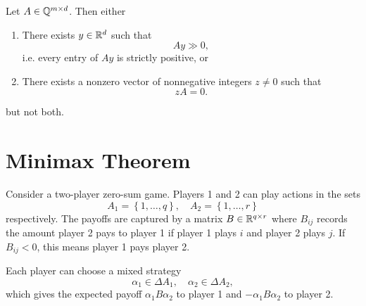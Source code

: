 \begin{lemma}[Gordan's]
	Let $A \in \mathbb{Q}^{m \times d}$. Then either
	\begin{enumerate}[label = (\roman*)]
		\item There exists $y \in \mathbb{R}^d$ such that  \[
			Ay \gg 0
		,\] i.e. every entry of $Ay$ is strictly positive, or
		\item There exists a nonzero vector of nonnegative integers $z \ne 0$ such that \[
			zA = 0
		.\] 
	\end{enumerate}
	but not both.
\end{lemma}

\section{Minimax Theorem}

Consider a two-player zero-sum game. Players 1 and 2 can play actions in the sets \[
	A_1 = \left\{1,\ldots,q\right\}, \quad A_2 = \left\{1,\ldots,r\right\}
\] respectively. The payoffs are captured by a matrix $B \in \mathbb{R}^{q\times r}$ where $B_{ij}$ records the amount player 2 pays to player 1 if player 1 plays $i$ and player 2 plays $j$. If $B_{ij} < 0$, this means player 1 pays player 2.

Each player can choose a mixed strategy \[
	\alpha_1 \in \Delta A_1, \quad \alpha_2 \in \Delta A_2
,\] which gives the expected payoff $\alpha_1 B \alpha_2$ to player 1 and $-\alpha_1 B \alpha_2$ to player 2.

